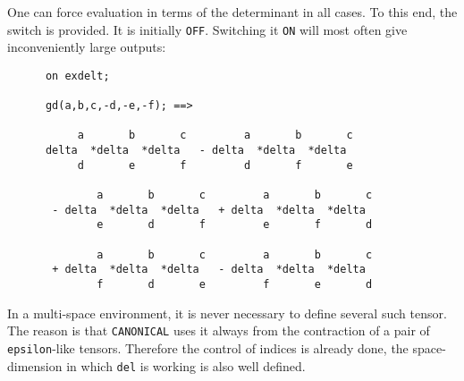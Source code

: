 One can force evaluation in terms of the determinant in all cases.
To this end, the switch  is provided. It is initially
\texttt{OFF}. Switching it \texttt{ON} will most often give inconveniently large outputs:
\begin{verbatim}
      on exdelt;

      gd(a,b,c,-d,-e,-f); ==>

           a       b       c         a       b       c
      delta  *delta  *delta   - delta  *delta  *delta
           d       e       f         d       f       e

              a       b       c         a       b       c
       - delta  *delta  *delta   + delta  *delta  *delta
              e       d       f         e       f       d

              a       b       c         a       b       c
       + delta  *delta  *delta   - delta  *delta  *delta
              f       d       e         f       e       d
\end{verbatim}
In a multi-space environment, it is never necessary to define several
such tensor. The reason is that \texttt{CANONICAL} uses it
always from the contraction of a pair of \texttt{epsilon}-like tensors.
Therefore the  control of indices is already done, the space-dimension
in which \texttt{del} is working  is also well defined.

